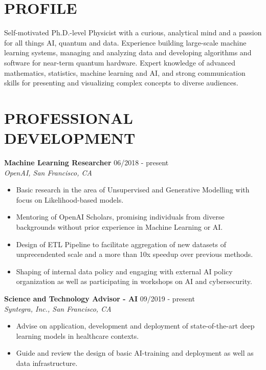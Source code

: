 \documentclass[10pt,centered]{./res} %
\begin{document}
\vspace*{-1.5cm}
\begin{resume}
\vspace{0.4cm}

\section{\color{ResumeBlue}PROFILE}
Self-motivated Ph.D.-level Physicist with a curious, analytical mind and a passion for all things AI, quantum and data. Experience building large-scale machine learning systems, managing and analyzing data and developing algorithms and software for near-term quantum hardware. Expert knowledge of advanced mathematics, statistics, machine learning and AI, and strong communication skills for presenting and visualizing complex concepts to diverse audiences.

\section{\color{ResumeBlue}PROFESSIONAL DEVELOPMENT}
{\bf Machine Learning Researcher} \hfill06/2018 - present \\
{\it OpenAI, San Francisco, CA}
\begin{itemize}
\item Basic research in the area of Unsupervised and Generative Modelling with focus on Likelihood-based models.
\item Mentoring of OpenAI Scholars, promising individuals from diverse backgrounds without prior experience in Machine Learning or AI.
\item Design of ETL Pipeline to facilitate aggregation of new datasets of unprecendented scale and a more than 10x speedup over previous methods.
\item Shaping of internal data policy and engaging with external AI policy organization as well as participating in workshops on AI and cybersecurity.
\end{itemize}

{\bf Science and Technology Advisor - AI} \hfill09/2019 - present \\
{\it Syntegra, Inc., San Francisco, CA}
\begin{itemize}
\item Advise on application, development and deployment of state-of-the-art deep learning models in healthcare contexts.
\item Guide and review the design of basic AI-training and deployment as well as data infrastructure.
\end{itemize}


\end{resume}
\end{document}
